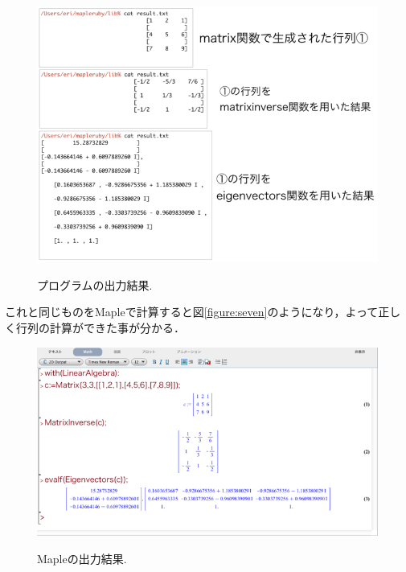 \begin{figure}[htbp]\begin{center}
\includegraphics[width=12cm,bb= 0 0 937 753]{../figs/./mapleruby_eringi.008.png}
\caption{プログラムの出力結果.}
\label{figure:six}
\label{default}\end{center}\end{figure}
\newpage
これと同じものをMapleで計算すると図\ref{figure:seven}のようになり，よって正しく行列の計算ができた事が分かる．

\begin{figure}[htbp]\begin{center}
\includegraphics[width=12cm,bb= 0 0 937 753]{../figs/./mapleruby_eringi.exmaple.png}
\caption{Mapleの出力結果.}
\label{figure:seven}
\label{default}\end{center}\end{figure}
